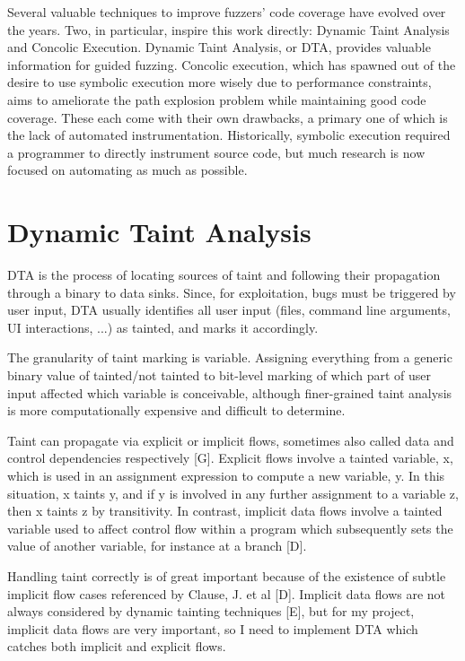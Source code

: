 \documentclass[11pt,expanded,copyright]{fsuthesis}
\begin{document}
Several valuable techniques to improve fuzzers' code coverage have evolved over the years. Two, in particular, inspire this work directly: Dynamic Taint Analysis and Concolic Execution. Dynamic Taint Analysis, or DTA, provides valuable information for guided fuzzing. Concolic execution, which has spawned out of the desire to use symbolic execution more wisely due to performance constraints, aims to ameliorate the path explosion problem while maintaining good code coverage. These each come with their own drawbacks, a primary one of which is the lack of automated instrumentation. Historically, symbolic execution required a programmer to directly instrument source code, but much research is now focused on automating as much as possible.

\section{Dynamic Taint Analysis}

DTA is the process of locating sources of taint and following their propagation through a binary to data sinks. Since, for exploitation, bugs must be triggered by user input, DTA usually identifies all user input (files, command line arguments, UI interactions, ...) as tainted, and marks it accordingly.

The granularity of taint marking is variable. Assigning everything from a generic binary value of tainted/not tainted to bit-level marking of which part of user input affected which variable is conceivable, although finer-grained taint analysis is more computationally expensive and difficult to determine. 

Taint can propagate via explicit or implicit flows, sometimes also called data and control dependencies respectively [G]. Explicit flows involve a tainted variable, x, which is used in an assignment expression to compute a new variable, y. In this situation, x taints y, and if y is involved in any further assignment to a variable z, then x taints z by transitivity. In contrast, implicit data flows involve a tainted variable used to affect control flow within a program which subsequently sets the value of another variable, for instance at a branch [D]. 

Handling taint correctly is of great important because of the existence of subtle implicit flow cases referenced by Clause, J. et al [D]. Implicit data flows are not always considered by dynamic tainting techniques [E], but for my project, implicit data flows are very important, so I need to implement DTA which catches both implicit and explicit flows.
\end{document}
